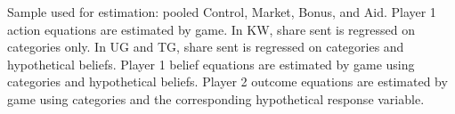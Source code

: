 \begin{flushleft}
\footnotesize Sample used for estimation: pooled Control, Market, Bonus, and Aid. Player 1 action equations are estimated by game. In KW, share sent is regressed on categories only. In UG and TG, share sent is regressed on categories and hypothetical beliefs. Player 1 belief equations are estimated by game using categories and hypothetical beliefs. Player 2 outcome equations are estimated by game using categories and the corresponding hypothetical response variable.
\end{flushleft}
